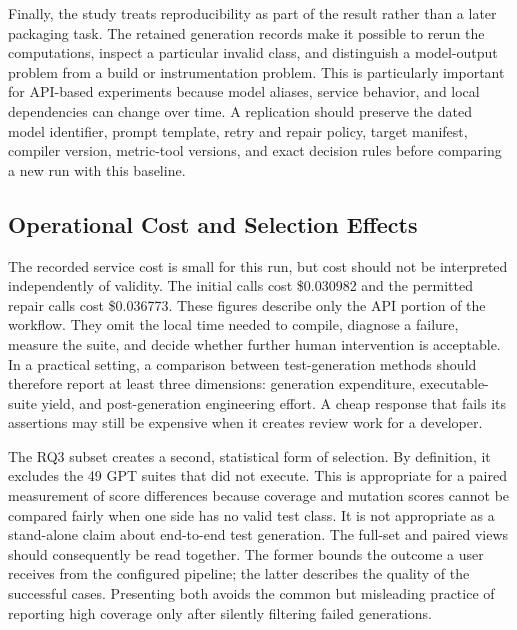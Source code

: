 Finally, the study treats reproducibility as part of the result rather than a later packaging task. The retained generation records make it possible to rerun the computations, inspect a particular invalid class, and distinguish a model-output problem from a build or instrumentation problem. This is particularly important for API-based experiments because model aliases, service behavior, and local dependencies can change over time. A replication should preserve the dated model identifier, prompt template, retry and repair policy, target manifest, compiler version, metric-tool versions, and exact decision rules before comparing a new run with this baseline.


\subsection{Operational Cost and Selection Effects}
The recorded service cost is small for this run, but cost should not be interpreted independently of validity. The initial calls cost \$0.030982 and the permitted repair calls cost \$0.036773. These figures describe only the API portion of the workflow. They omit the local time needed to compile, diagnose a failure, measure the suite, and decide whether further human intervention is acceptable. In a practical setting, a comparison between test-generation methods should therefore report at least three dimensions: generation expenditure, executable-suite yield, and post-generation engineering effort. A cheap response that fails its assertions may still be expensive when it creates review work for a developer.

The RQ3 subset creates a second, statistical form of selection. By definition, it excludes the 49 GPT suites that did not execute. This is appropriate for a paired measurement of score differences because coverage and mutation scores cannot be compared fairly when one side has no valid test class. It is not appropriate as a stand-alone claim about end-to-end test generation. The full-set and paired views should consequently be read together. The former bounds the outcome a user receives from the configured pipeline; the latter describes the quality of the successful cases. Presenting both avoids the common but misleading practice of reporting high coverage only after silently filtering failed generations.

